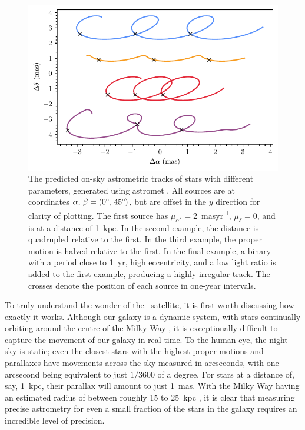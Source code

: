 \begin{figure}[tb]
	\includegraphics[width=\textwidth]{fig/c1/tracks.pdf}
	\caption[The predicted on-sky astrometric tracks of stars with different parameters]{The predicted on-sky astrometric tracks of stars with different parameters, generated using astromet \citep{penoyre_astrometric_2022}. All sources are at coordinates $\alpha,\,\beta=(0\degree,\,45\degree)$, but are offset in the $y$ direction for clarity of plotting. The first source has $\mu_{\alpha^*}=2$~masyr\textsuperscript{-1}, $\mu_{\delta}=0$, and is at a distance of 1~kpc. In the second example, the distance is quadrupled relative to the first. In the third example, the proper motion is halved relative to the first. In the final example, a binary with a period close to 1~yr, high eccentricity, and a low light ratio is added to the first example, producing a highly irregular track. The crosses denote the position of each source in one-year intervals.}
	\label{fig:intro:history:gaia_tracks}
\end{figure}

To truly understand the wonder of the \gaia\ satellite, it is first worth discussing how exactly it works. Although our galaxy is a dynamic system, with stars continually orbiting around the centre of the Milky Way \citep{binney_galactic_1987}, it is exceptionally difficult to capture the movement of our galaxy in real time. To the human eye, the night sky is static; even the closest stars with the highest proper motions and parallaxes have movements across the sky measured in arcseconds, with one arcsecond being equivalent to just $1/3600$ of a degree. For stars at a distance of, say, 1~kpc, their parallax will amount to just 1~mas. With the Milky Way having an estimated radius of between roughly 15 to 25~kpc \citep{lopez-corredoira_disk_stars_2018}, it is clear that measuring precise astrometry for even a small fraction of the stars in the galaxy requires an incredible level of precision.

